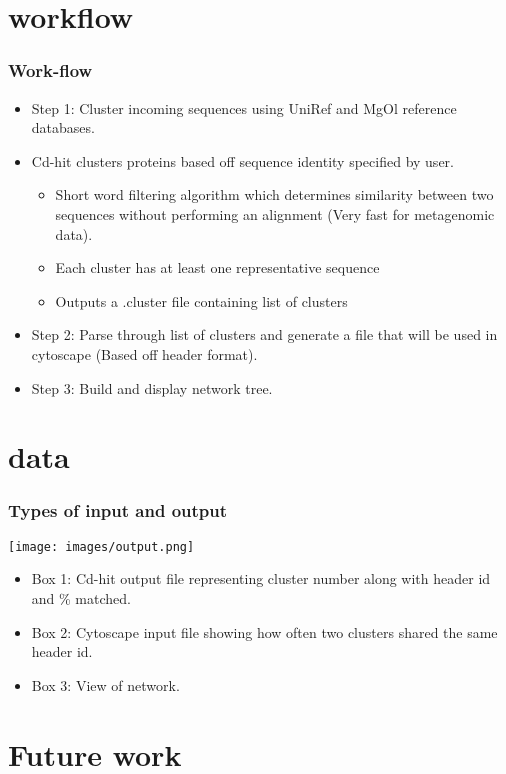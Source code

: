 \documentclass{beamer}
\begin{document}
\section{workflow}
\begin{frame}[fragile]
\frametitle{Work-flow}

\begin{itemize}
\item Step 1: Cluster incoming sequences using UniRef and MgOl reference databases.

	 \item Cd-hit clusters proteins based off sequence identity specified by user. 
	 	 \begin{itemize}
	 \item Short word filtering algorithm which determines similarity  between two sequences without performing an alignment (Very fast for metagenomic data). 
	 \item Each cluster has at least one representative sequence 
	 \item Outputs a .cluster file containing list of clusters
	 \end{itemize}
\item Step 2: Parse through list of clusters and generate a file that will be used in cytoscape (Based off header format).
\item Step 3: Build and display network tree.

\end{itemize}

\end{frame}


\section{data}
\begin{frame}[fragile]
\frametitle{Types of input and output}
\texttt{[image: images/output.png]} 
\begin{itemize}
\item Box 1: Cd-hit output file representing cluster number along with header id and \% matched.
\item Box 2: Cytoscape input file showing how often two clusters shared the same header id.
\item Box 3: View of network.
\end{itemize}

\end{frame}


\section{Future work}
\end{document}
